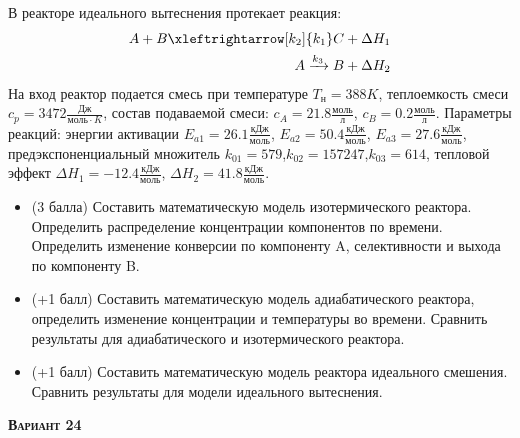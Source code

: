  В реакторе идеального вытеснения протекает реакция: \begin{equation*} \begin{aligned} A+B \xleftrightarrow[k_2]{k_1} C +\Delta H_1 \\ A \xrightarrow{k_3} B + \Delta H_2 \end{aligned} \end{equation*}                                     На вход  реактор подается смесь при температуре $ T_н =  388 K$, теплоемкость смеси $c_p= 3472 \frac{Дж}{моль \cdot K}$, состав подаваемой смеси: $c_A=21.8 \frac{моль}{л}$, $c_B=0.2 \frac{моль}{л}$. Параметры реакций: энергии активации $E_{a1}=26.1 \frac{кДж}{моль}$, $E_{a2}=50.4  \frac{кДж}{моль}$, $E_{a3}=27.6  \frac{кДж}{моль}$, предэкспоненциальный множитель $k_{01}=       579$,$k_{02}=    157247$,$k_{03}=       614$, тепловой эффект $\Delta H_1= -12.4  \frac{кДж}{моль}$, $\Delta H_2=41.8 \frac{кДж}{моль}$.\begin{itemize} \item (3 балла) Составить математическую модель изотермического реактора. Определить распределение концентрации компонентов по времени. Определить изменение конверсии по компоненту A, селективности и выхода по компоненту B. \item (+1 балл) Составить математическую модель адиабатического реактора, определить изменение концентрации и температуры во времени. Сравнить результаты для адиабатического и изотермического реактора. \item (+1 балл) Составить математическую модель реактора идеального смешения. Сравнить результаты для модели идеального вытеснения. \end{itemize}

\textsc{\textbf{Вариант 24}}

